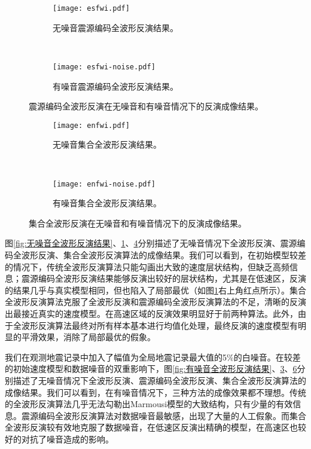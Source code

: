 \begin{figure}[ht]
    \begin{subfigure}[b]{0.5\textwidth}
        \centering
        \texttt{[image: esfwi.pdf]}
        \caption{无噪音震源编码全波形反演结果。}
        \label{fig:无噪音震源编码全波形反演结果}
    \end{subfigure}%
    ~
    \begin{subfigure}[b]{0.5\textwidth}
        \centering
        \texttt{[image: esfwi-noise.pdf]}
        \caption{有噪音震源编码全波形反演结果。}
        \label{fig:有噪音震源编码全波形反演结果}
    \end{subfigure}
    \caption{震源编码全波形反演在无噪音和有噪音情况下的反演成像结果。}
\end{figure}

\begin{figure}[ht]
    \begin{subfigure}[b]{0.5\textwidth}
        \centering
        \texttt{[image: enfwi.pdf]}
        \caption{无噪音集合全波形反演结果。}
        \label{fig:无噪音集合全波形反演结果}
    \end{subfigure}%
    ~
    \begin{subfigure}[b]{0.5\textwidth}
        \centering
        \texttt{[image: enfwi-noise.pdf]}
        \caption{有噪音集合全波形反演结果。}
        \label{fig:有噪音集合全波形反演结果}
    \end{subfigure}
    \caption{集合全波形反演在无噪音和有噪音情况下的反演成像结果。}
\end{figure}

图\ref{fig:无噪音全波形反演结果}、\ref{fig:无噪音震源编码全波形反演结果}、\ref{fig:无噪音集合全波形反演结果}分别描述了无噪音情况下全波形反演、震源编码全波形反演、集合全波形反演算法的成像结果。我们可以看到，在初始模型较差的情况下，传统全波形反演算法只能勾画出大致的速度层状结构，但缺乏高频信息；震源编码全波形反演结果能够反演出较好的层状结构，尤其是在低速区，反演的结果几乎与真实模型相同，但也陷入了局部最优（如图\ref{fig:无噪音震源编码全波形反演结果}右上角红点所示）。集合全波形反演算法克服了全波形反演和震源编码全波形反演算法的不足，清晰的反演出最接近真实的速度模型。在高速区域的反演效果明显好于前两种算法。此外，由于全波形反演算法最终对所有样本基本进行均值化处理，最终反演的速度模型有明显的平滑效果，消除了局部最优的假象。

我们在观测地震记录中加入了幅值为全局地震记录最大值的5\%的白噪音。在较差的初始速度模型和数据噪音的双重影响下，图\ref{fig:有噪音全波形反演结果}、\ref{fig:有噪音震源编码全波形反演结果}、\ref{fig:有噪音集合全波形反演结果}分别描述了无噪音情况下全波形反演、震源编码全波形反演、集合全波形反演算法的成像结果。我们可以看到，在有噪音情况下，三种方法的成像效果都不理想。传统的全波形反演算法几乎无法勾勒出Marmousi模型的大致结构，只有少量的有效信息。震源编码全波形反演算法对数据噪音最敏感，出现了大量的人工假象。而集合全波形反演较有效地克服了数据噪音，在低速区反演出精确的模型，在高速区也较好的对抗了噪音造成的影响。

